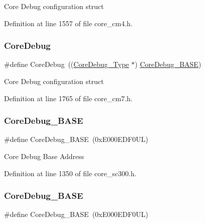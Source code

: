 Core Debug configuration struct 

Definition at line 1557 of file core\+\_\+cm4.\+h.

\mbox{\label{group___c_m_s_i_s__core__base_gab6e30a2b802d9021619dbb0be7f5d63d}} 
\subsubsection{\texorpdfstring{Core\+Debug}{CoreDebug}\hspace{0.1cm}{\footnotesize\ttfamily [4/4]}}
{\footnotesize\ttfamily \#define Core\+Debug~((\hyperlink{struct_core_debug___type}{Core\+Debug\+\_\+\+Type} $\ast$)     \hyperlink{group___c_m_s_i_s__core__base_ga680604dbcda9e9b31a1639fcffe5230b}{Core\+Debug\+\_\+\+B\+A\+SE})}

Core Debug configuration struct 

Definition at line 1765 of file core\+\_\+cm7.\+h.

\mbox{\label{group___c_m_s_i_s__core__base_ga680604dbcda9e9b31a1639fcffe5230b}} 
\subsubsection{\texorpdfstring{Core\+Debug\+\_\+\+B\+A\+SE}{CoreDebug\_BASE}\hspace{0.1cm}{\footnotesize\ttfamily [1/4]}}
{\footnotesize\ttfamily \#define Core\+Debug\+\_\+\+B\+A\+SE~(0x\+E000\+E\+D\+F0\+U\+L)}

Core Debug Base Address 

Definition at line 1350 of file core\+\_\+sc300.\+h.

\mbox{\label{group___c_m_s_i_s__core__base_ga680604dbcda9e9b31a1639fcffe5230b}} 
\subsubsection{\texorpdfstring{Core\+Debug\+\_\+\+B\+A\+SE}{CoreDebug\_BASE}\hspace{0.1cm}{\footnotesize\ttfamily [2/4]}}
{\footnotesize\ttfamily \#define Core\+Debug\+\_\+\+B\+A\+SE~(0x\+E000\+E\+D\+F0\+U\+L)}


